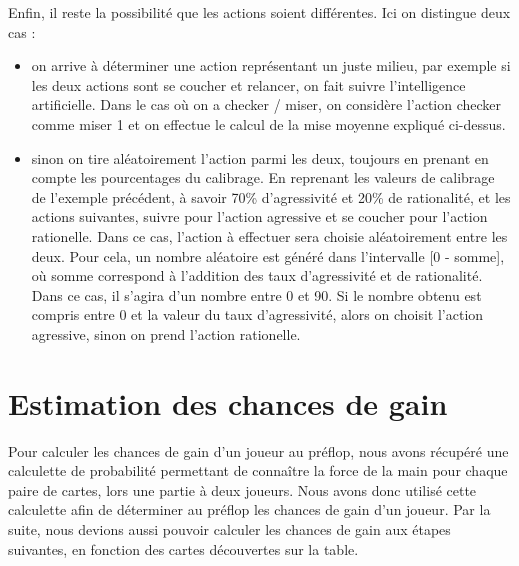 \documentclass{report}
\begin{document}
Enfin, il reste la possibilité que les actions soient différentes. Ici on distingue deux cas :
\begin{itemize}
\renewcommand{\labelitemi}{-}
\item on arrive à déterminer une action représentant un juste milieu, par exemple si les deux actions sont se coucher et relancer, on fait suivre l'intelligence artificielle. Dans le cas où on a checker / miser, on considère l'action checker comme miser 1 et on effectue le calcul de la mise moyenne expliqué ci-dessus.
\item sinon on tire aléatoirement l'action parmi les deux, toujours en prenant en compte les pourcentages du calibrage. 
En reprenant les valeurs de calibrage de l'exemple précédent, à savoir 70\% d'agressivité et 20\% de rationalité, et les actions suivantes, suivre pour l'action agressive et se coucher pour l'action rationelle. Dans ce cas, l'action à effectuer sera choisie aléatoirement entre les deux. Pour cela, un nombre aléatoire est généré dans l'intervalle [0 - somme], où somme correspond à l'addition des taux d'agressivité et de rationalité. Dans ce cas, il s'agira d'un nombre entre 0 et 90. Si le nombre obtenu est compris entre 0 et la valeur du taux d'agressivité, alors on choisit l'action agressive, sinon on prend l'action rationelle.

\end{itemize}


\section{Estimation des chances de gain}
\hspace{0.5cm}Pour calculer les chances de gain d'un joueur au préflop, nous avons récupéré une calculette de probabilité permettant de connaître la force de la main pour chaque paire de cartes, lors une partie à deux joueurs. Nous avons donc utilisé cette calculette afin de déterminer au préflop les chances de gain d'un joueur. Par la suite, nous devions aussi pouvoir calculer les chances de gain aux étapes suivantes, en fonction des cartes découvertes sur la table.\\
\end{document}
